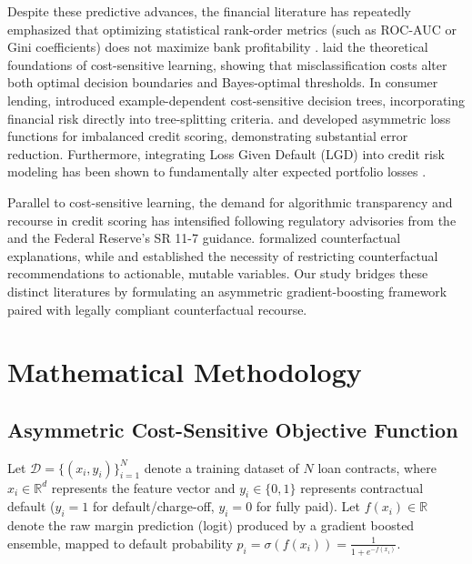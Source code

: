 \documentclass[11pt,a4paper]{article}
\begin{document}
Despite these predictive advances, the financial literature has repeatedly emphasized that optimizing statistical rank-order metrics (such as ROC-AUC or Gini coefficients) does not maximize bank profitability \citep{verbraeken2014development, petrides2022profit, zhang2023profit}. \citet{elkan2001foundations} laid the theoretical foundations of cost-sensitive learning, showing that misclassification costs alter both optimal decision boundaries and Bayes-optimal thresholds. In consumer lending, \citet{bahnsen2014novel, bahnsen2015ensemble} introduced example-dependent cost-sensitive decision trees, incorporating financial risk directly into tree-splitting criteria. \citet{cao2021asymmetric} and \citet{wang2022deep} developed asymmetric loss functions for imbalanced credit scoring, demonstrating substantial error reduction. Furthermore, integrating Loss Given Default (LGD) into credit risk modeling has been shown to fundamentally alter expected portfolio losses \citep{altman2005default, dermine2006bank, qi2011comparison, bellotti2012loss}.

Parallel to cost-sensitive learning, the demand for algorithmic transparency and recourse in credit scoring has intensified following regulatory advisories from the \citet{cfpb2022circular} and the Federal Reserve's SR 11-7 guidance. \citet{wachter2017counterfactual} formalized counterfactual explanations, while \citet{ustun2019actionable} and \citet{karimi2021model} established the necessity of restricting counterfactual recommendations to actionable, mutable variables. Our study bridges these distinct literatures by formulating an asymmetric gradient-boosting framework paired with legally compliant counterfactual recourse.

\section{Mathematical Methodology}

\subsection{Asymmetric Cost-Sensitive Objective Function}
Let $\mathcal{D} = \{(x_i, y_i)\}_{i=1}^N$ denote a training dataset of $N$ loan contracts, where $x_i \in \mathbb{R}^d$ represents the feature vector and $y_i \in \{0, 1\}$ represents contractual default ($y_i = 1$ for default/charge-off, $y_i = 0$ for fully paid). Let $f(x_i) \in \mathbb{R}$ denote the raw margin prediction (logit) produced by a gradient boosted ensemble, mapped to default probability $p_i = \sigma(f(x_i)) = \frac{1}{1 + e^{-f(x_i)}}$.
\end{document}
